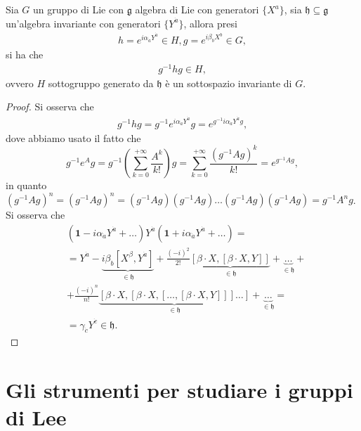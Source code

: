 \begin{prop}
    Sia $G$ un gruppo di Lie con $\mathfrak{g}$ algebra di Lie con generatori $\{ X^a \}$, sia $\mathfrak{h} \subseteq \mathfrak{g}$ un'algebra invariante con generatori $\{ Y^{\dot{a}} \}$, allora presi
    \begin{align}
        h = e^{i \alpha_{\dot{a}} Y^{\dot{a}}} \in H, g = e^{i \beta_b X^b} \in G, 
    \end{align} 
    si ha che
    \begin{align}
        g^{-1} h g \in H,
    \end{align}
    ovvero $H$ sottogruppo generato da $\mathfrak{h}$ è un sottospazio invariante di $G$.
\end{prop}
\begin{proof}
    Si osserva che
    \begin{align}
        g^{-1} h g = g^{-1} e^{i \alpha_{\dot{a}} Y^{\dot{a}}} g = e^{g^{-1} i \alpha_{\dot{a}} Y^{\dot{a}} g},
    \end{align}
    dove abbiamo usato il fatto che
    $$
        g^{-1} e^{A} g = g^{-1} \left( \sum_{k = 0}^{+\infty} \frac{A^k}{k!} \right) g = \sum_{k=0}^{+\infty} \frac{(g^{-1}Ag)^k}{k!} = e^{g^{-1} A g},
    $$
    in quanto $(g^{-1} A g)^n = (g^{-1} A g)^n = (g^{-1} A g)(g^{-1} A g) \ldots (g^{-1}Ag)(g^{-1} A g) = g^{-1} A^n g$.
    Si osserva che
    \begin{align}
        &(\mathbf{1} - i \alpha_{\dot{a}} Y^{\dot{a}} + \ldots) Y^{\dot{a}} (\mathbf{1} + i \alpha_{\dot{a}} Y^{\dot{a}} + \ldots) = \\
        &= Y^{\dot{a}} - \underbrace{i \beta_b[X^\beta, Y^{\dot{a}}]}_{{\in \mathfrak{h}}} + \frac{(-i)^2}{2!} \underbrace{[\beta \cdot X, [\beta \cdot X, Y]]}_{\in \mathfrak{h}} + \underbrace{\ldots}_{\in \mathfrak{h}} + \\
        &+\frac{(-i)^n}{n!}\underbrace{[\beta \cdot X, [\beta \cdot X, [\ldots, [\beta \cdot X, Y]]] \ldots]}_{\in \mathfrak{h}} + \underbrace{\ldots}_{\in \mathfrak{h}} = \\
        &= \gamma_{\dot{c}} Y^{\dot{c}} \in \mathfrak{h}.
    \end{align}
\end{proof}

\section{Gli strumenti per studiare i gruppi di Lee}

